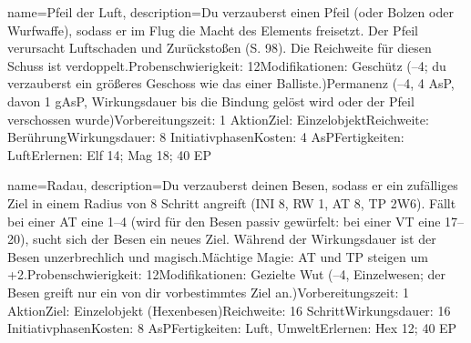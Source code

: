 {
    name={Pfeil der Luft},
    description={Du verzauberst einen Pfeil (oder Bolzen oder Wurfwaffe), sodass er im Flug die Macht des Elements freisetzt. Der Pfeil verursacht Luftschaden und Zurückstoßen (S. 98). Die Reichweite für diesen Schuss ist verdoppelt.\newline Probenschwierigkeit: 12\newline Modifikationen: Geschütz (–4; du verzauberst ein größeres Geschoss wie das einer Balliste.)\newline Permanenz (–4, 4 AsP, davon 1 gAsP, Wirkungsdauer bis die Bindung gelöst wird oder der Pfeil verschossen wurde)\newline Vorbereitungszeit: 1 Aktion\newline Ziel: Einzelobjekt\newline Reichweite: Berührung\newline Wirkungsdauer: 8 Initiativphasen\newline Kosten: 4 AsP\newline Fertigkeiten: Luft\newline Erlernen: Elf 14; Mag 18; 40 EP}
}


{
    name={Radau},
    description={Du verzauberst deinen Besen, sodass er ein zufälliges Ziel in einem Radius von 8 Schritt angreift (INI 8, RW 1, AT 8, TP 2W6). Fällt bei einer AT eine 1–4 (wird für den Besen passiv gewürfelt: bei einer VT eine 17–20), sucht sich der Besen ein neues Ziel. Während der Wirkungsdauer ist der Besen unzerbrechlich und magisch.\newline Mächtige Magie: AT und TP steigen um +2.\newline Probenschwierigkeit: 12\newline Modifikationen: Gezielte Wut (–4, Einzelwesen; der Besen greift nur ein von dir vorbestimmtes Ziel an.)\newline Vorbereitungszeit: 1 Aktion\newline Ziel: Einzelobjekt (Hexenbesen)\newline Reichweite: 16 Schritt\newline Wirkungsdauer: 16 Initiativphasen\newline Kosten: 8 AsP\newline Fertigkeiten: Luft, Umwelt\newline Erlernen: Hex 12; 40 EP}
}


